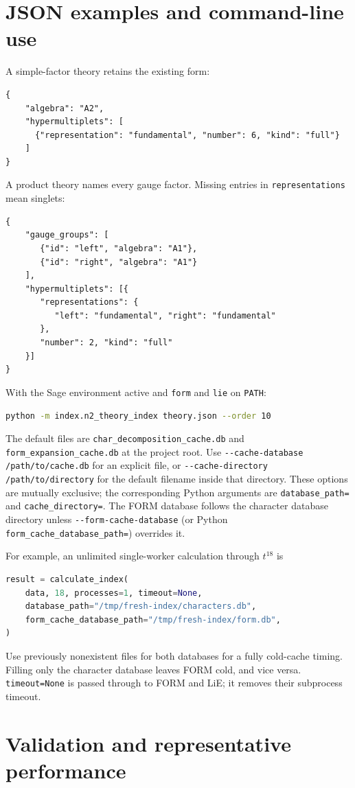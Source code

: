 \documentclass[11pt,a4paper]{article}
\newcommand{\code}[1]{{\small\nolinkurl{#1}}}
\begin{document}
\section{JSON examples and command-line use}\label{sec:json}
A simple-factor theory retains the existing form:
\begin{lstlisting}
{
    "algebra": "A2",
    "hypermultiplets": [
      {"representation": "fundamental", "number": 6, "kind": "full"}
    ]
}
\end{lstlisting}
A product theory names every gauge factor. Missing entries in
\code{representations} mean singlets:
\begin{lstlisting}
{
    "gauge_groups": [
       {"id": "left", "algebra": "A1"},
       {"id": "right", "algebra": "A1"}
    ],
    "hypermultiplets": [{
       "representations": {
          "left": "fundamental", "right": "fundamental"
       },
       "number": 2, "kind": "full"
    }]
}
\end{lstlisting}
With the Sage environment active and \code{form} and \code{lie} on \code{PATH}:
\begin{lstlisting}[language=bash]
python -m index.n2_theory_index theory.json --order 10
\end{lstlisting}
The default files are \code{char_decomposition_cache.db} and
\code{form_expansion_cache.db} at the project root.
Use \code{--cache-database} \code{/path/to/cache.db} for an explicit file, or
\code{--cache-directory} \code{/path/to/directory} for the default filename inside that
directory. These options are mutually exclusive; the corresponding Python
arguments are \code{database_path=} and \code{cache_directory=}. The FORM database
follows the character database directory unless \code{--form-cache-database}
(or Python \code{form_cache_database_path=}) overrides it.

For example, an unlimited single-worker calculation through $t^{18}$ is
\begin{lstlisting}[language=Python]
result = calculate_index(
    data, 18, processes=1, timeout=None,
    database_path="/tmp/fresh-index/characters.db",
    form_cache_database_path="/tmp/fresh-index/form.db",
)
\end{lstlisting}
Use previously nonexistent files for both databases for a fully cold-cache
timing. Filling only the character database leaves FORM cold, and vice versa. \code{timeout=None}
is passed through to FORM and LiE; it removes their subprocess timeout.

\clearpage
\section{Validation and representative performance}\label{sec:validation}
\end{document}
